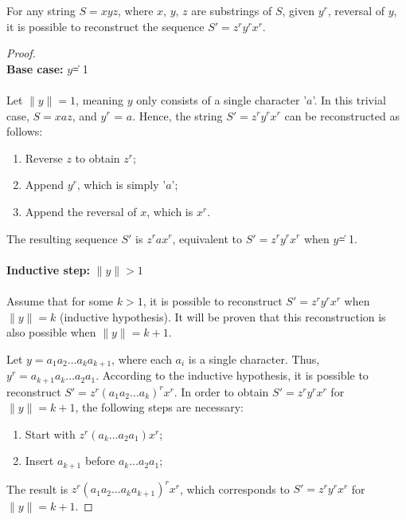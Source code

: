 \begin{theorem}
    For any string \( S = xyz \), where \( x \), \( y \), \( z \) are substrings of \( S \), given \(y^r \), reversal of \(y\), it is possible to reconstruct the sequence \( S' = z^r y^r x^r \). 
\end{theorem}
\begin{proof}
\\ 
\textbf{Base case: } \|\( y \)\| = 1 \\
\\ Let \( \| y \| = 1 \), meaning \( y \) only consists of a single character '\( a \)'. In this trivial case, \( S = xaz \), and \(y^r \) = \( a \). Hence, the string \( S' = z^r y^r x^r \) can be reconstructed as follows: 
\begin{enumerate}
\item Reverse \( z \) to obtain \( z^r \);
\item Append \( y^r \), which is simply '\( a \)';
\item Append the reversal of \( x \), which is \( x^r \).
\end{enumerate}
The resulting sequence \( S' \) is \(z^r a x^r \), equivalent to \( S' = z^r y^r x^r \) when \|\( y \)\| = 1. \\
\\ \textbf{Inductive step: } \( \| y \| > 1 \) \\

\\ Assume that for some \( k > 1 \), it is possible to reconstruct \( S' = z^r y^r x^r \) when \( \| y \| = k \) (inductive hypothesis). It will be proven that this reconstruction is also possible when \( \| y \| = k + 1 \). 

Let \( y = a_1 a_2 \dots a_k a_{k+1} \), where each \( a_i \) is a single character. Thus, \( y^r = a_{k+1} a_k \dots a_2 a_1 \). According to the inductive hypothesis, it is possible to reconstruct \( S' = z^r (a_1 a_2 \dots a_k)^r x^r \). In order to obtain \( S' = z^r y^r x^r \) for \( \| y \| = k + 1 \), the following steps are necessary:
\begin{enumerate}
    \item Start with \( z^r (a_k \dots a_2 a_1) x^r \);
    \item Insert \( a_{k+1} \) before \( a_k \dots a_2 a_1 \);
\end{enumerate}
The result is \( z^r (a_1 a_2 \dots a_k a_{k+1})^r x^r \), which corresponds to \( S' = z^r y^r x^r \) for \( \| y \| = k + 1 \).
\end{proof}

